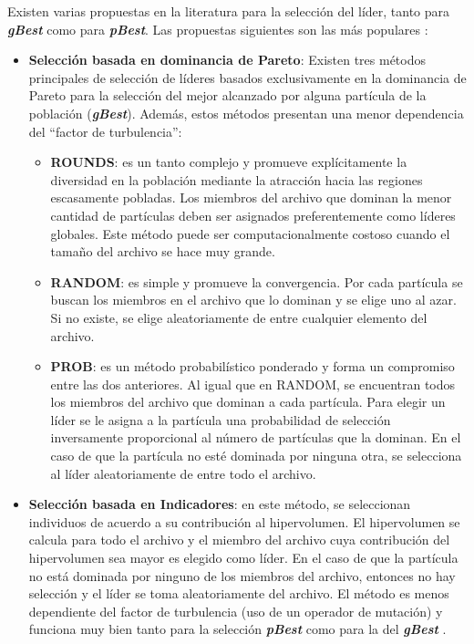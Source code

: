   Existen varias propuestas en la literatura para la selecci\'on del l\'ider, tanto para \textbf{\textit{gBest}} como para 
  \textbf{\textit{pBest}}. Las propuestas siguientes son las m\'as populares \cite{Nik11}:

  \begin{itemize}
   \item \textbf{Selecci\'on basada en dominancia de Pareto}: Existen tres m\'etodos principales de selecci\'on de l\'ideres 
   basados exclusivamente en la dominancia de Pareto para la selecci\'on del mejor alcanzado por alguna 
   part\'icula de la poblaci\'on (\textbf{\textit{gBest}}). Adem\'as, estos m\'etodos presentan una menor dependencia del 
   ``factor de turbulencia'':

    \begin{itemize}
     \item \textbf{ROUNDS}: es un tanto complejo y promueve expl\'icitamente la diversidad en la poblaci\'on mediante la 
     atracci\'on hacia las regiones escasamente pobladas. Los miembros del archivo que dominan la menor cantidad de 
     part\'iculas deben ser asignados preferentemente como l\'ideres globales. Este m\'etodo puede ser computacionalmente 
     costoso cuando el tama\~no del archivo se hace muy grande.
     \item \textbf{RANDOM}: es simple y promueve la convergencia. Por cada part\'icula se buscan los miembros en el archivo 
     que lo dominan y se elige uno al azar. Si no existe, se elige aleatoriamente de entre cualquier elemento del archivo.    
     \item \textbf{PROB}: es un m\'etodo probabil\'istico ponderado y forma un compromiso entre las dos anteriores. Al igual 
     que en RANDOM, se encuentran todos los miembros del archivo que dominan a cada part\'icula. Para elegir un l\'ider se 
     le asigna a la part\'icula una probabilidad de selecci\'on inversamente proporcional al n\'umero de part\'iculas que 
     la dominan. En el caso de que la part\'icula no est\'e dominada por ninguna otra, se selecciona al l\'ider aleatoriamente
     de entre todo el archivo.
    \end{itemize}

    \item \textbf{Selecci\'on basada en Indicadores}: en este m\'etodo, se seleccionan individuos de acuerdo a su contribuci\'on
    al hipervolumen. El hipervolumen se calcula para todo el archivo y el miembro del archivo cuya contribuci\'on del hipervolumen
    sea mayor es elegido como l\'ider. En el caso de que la part\'icula no est\'a dominada por ninguno de los miembros del 
    archivo, entonces no hay selecci\'on y el l\'ider se toma aleatoriamente del archivo. El m\'etodo es menos dependiente del
    factor de turbulencia (uso de un operador de mutaci\'on) y funciona muy bien tanto para la selecci\'on \textbf{\textit{pBest}}
    como para la del \textbf{\textit{gBest}} \cite{Parallel}.
  \end{itemize}

